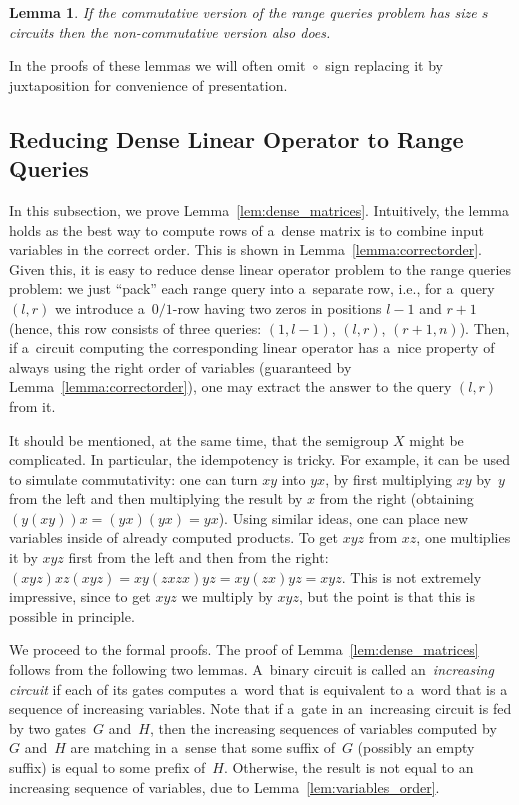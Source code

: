 \documentclass[11pt,letterpaper]{article}
\newtheorem{lemma}{Lemma}
\begin{document}
\begin{lemma} \label{lem:intervals}
If the commutative version of the range queries problem has size $s$ circuits then the non-commutative version also does.
\end{lemma}

In the proofs of these lemmas we will often omit~$\circ$~sign replacing it by juxtaposition for convenience of presentation.

\subsection{Reducing Dense Linear Operator to Range Queries}
In this subsection, we prove Lemma~\ref{lem:dense_matrices}. Intuitively, the lemma holds as the best way to compute rows of a~dense matrix is to combine input variables in the correct order. This is shown in Lemma~\ref{lemma:correctorder}. Given this, it is easy to reduce dense linear operator problem to the range queries problem: we just ``pack'' each range query into a~separate row, i.e., for a~query $(l,r)$ we introduce a~$0/1$-row having two zeros in positions $l-1$ and $r+1$ (hence, this row consists of three queries: $(1,l-1)$, $(l,r)$, $(r+1,n)$). Then, if a~circuit computing the corresponding linear operator has a~nice property of always using the right order of variables (guaranteed by Lemma~\ref{lemma:correctorder}), one may extract the answer to the query $(l,r)$ from it.

It should be mentioned, at the same time, that the semigroup $X$ might be complicated. In particular, the idempotency is tricky. For example, it can be used to simulate commutativity: one can turn $xy$ into $yx$, by first multiplying $xy$ by~$y$ from the left and then multiplying the result by $x$ from the right (obtaining $(y(xy))x=(yx)(yx)=yx$). Using similar ideas, one can place new variables inside of already computed products. To get $xyz$ from $xz$, one multiplies it by $xyz$ first from the left and then from the right: $(xyz)xz(xyz)=xy(zxzx)yz=xy(zx)yz=xyz$.
This is not extremely impressive, since to get $xyz$ we multiply by $xyz$, but the point is that this is possible in principle.

We proceed to the formal proofs. The proof of Lemma~\ref{lem:dense_matrices} follows from the following two lemmas. A~binary circuit is called an~{\em increasing circuit} if each of its gates computes a~word that is equivalent to a~word that is a sequence of increasing variables.
Note that if a~gate in an~increasing circuit is fed by two gates~$G$ and~$H$, then the increasing sequences of variables computed by~$G$ and~$H$ are matching in a~sense that some suffix of~$G$ (possibly an empty suffix) is equal to some prefix of~$H$. Otherwise, the result is not equal to an increasing sequence of variables, due to Lemma~\ref{lem:variables_order}.
\end{document}
